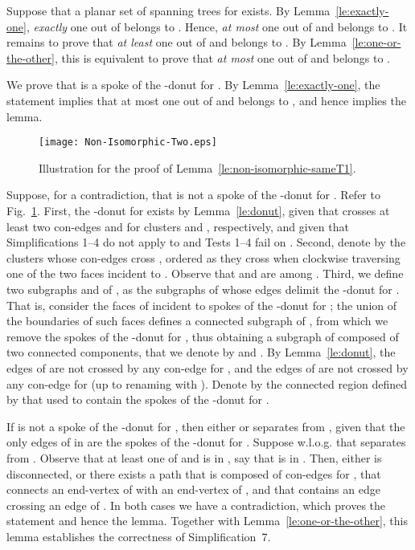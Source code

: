 \documentclass[letter,runningheads]{llncs}
\renewenvironment{proof}
{{\em Proof.\ }}{\hspace*{\fill}\par\vspace{2mm}}
\begin{document}
\begin{proof}
Suppose that a planar set  of spanning trees for  exists. By Lemma~\ref{le:exactly-one}, {\em exactly} one out of  belongs to . Hence, {\em at most} one out of  and  belongs to . It remains to prove that {\em at least} one out of  and  belongs to . By Lemma~\ref{le:one-or-the-other}, this is equivalent to prove that {\em at most} one out of  and  belongs to .

We prove that  is a spoke of the -donut for . By Lemma~\ref{le:exactly-one}, the statement implies that at most one out of  and  belongs to , and hence implies the lemma.

\begin{figure}[tb]
\begin{center}
\mbox{\texttt{[image: Non-Isomorphic-Two.eps]}}
\caption{Illustration for the proof of Lemma~\ref{le:non-isomorphic-sameT1}.}
\label{fig:non-isomorphic-two}
\end{center}
\end{figure}

Suppose, for a contradiction, that  is not a spoke of the -donut for . Refer to Fig.~\ref{fig:non-isomorphic-two}. First, the -donut for  exists by Lemma~\ref{le:donut}, given that  crosses at least two con-edges  and  for clusters  and , respectively, and given that {\sc Simplifications 1--4} do not apply to  and {\sc Tests 1--4} fail on . Second, denote by  the clusters whose con-edges cross , ordered as they cross  when clockwise traversing one of the two faces incident to . Observe that  and  are among . Third, we define two subgraphs  and  of , as the subgraphs of  whose edges delimit the -donut for . That is, consider the faces of  incident to spokes of the -donut for ; the union of the boundaries of such faces defines a connected subgraph of , from which we remove the spokes of the -donut for , thus obtaining a subgraph  of  composed of two connected components, that we denote by  and . By Lemma~\ref{le:donut}, the edges of  are not crossed by any con-edge for , and the edges of  are not crossed by any con-edge for  (up to renaming  with ). Denote by  the connected region defined by  that used to contain the spokes of the -donut for .

If  is not a spoke of the -donut for , then either  or  separates  from , given that the only edges of  in  are the spokes of the -donut for . Suppose w.l.o.g. that  separates  from . Observe that at least one of  and  is in , say that  is in . Then, either  is disconnected, or there exists a path that is composed of con-edges for , that connects an end-vertex of  with an end-vertex of , and that contains an edge crossing an edge of . In both cases we have a contradiction, which proves the statement and hence the lemma. Together with Lemma~\ref{le:one-or-the-other}, this lemma establishes the correctness of {\sc Simplification~7}.
\end{proof}
\end{document}
